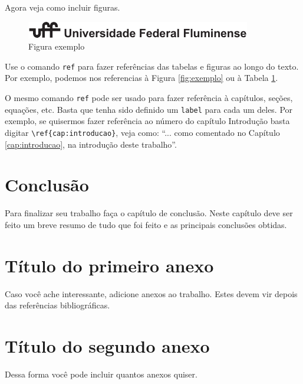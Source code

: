 \documentclass[12pt,a4paper,header]{abnt}
\begin{document}
Agora veja como incluir figuras.

\begin{figure}[h!]
\centering
\includegraphics[width=0.5\linewidth]{logoUFF.pdf}
\caption{Figura exemplo} \label{tab:exemplo}
\end{figure}

Use o comando \verb|ref| para fazer referências das tabelas e figuras ao longo do texto. Por exemplo, podemos nos referencias à Figura \ref{fig:exemplo} ou à Tabela \ref{tab:exemplo}. 

O mesmo comando \verb|ref| pode ser usado para fazer referência à capítulos, seções, equações, etc. Basta que tenha sido definido um \verb|label| para cada um deles. Por exemplo, se quisermos fazer referência ao número do capítulo Introdução basta digitar \verb|\ref{cap:introducao}|, veja como: ``... como comentado no Capítulo \ref{cap:introducao}, na introdução deste trabalho''. 




\chapter{Conclusão}

Para finalizar seu trabalho faça o capítulo de conclusão. Neste capítulo deve ser feito um breve resumo de tudo que foi feito e as principais conclusões obtidas.






\anexo



\chapter{Título do primeiro anexo}

Caso você ache interessante, adicione anexos ao trabalho. Estes devem vir depois das referências bibliográficas. 



\chapter{Título do segundo anexo}

Dessa forma você pode incluir quantos anexos quiser. 
\end{document}
